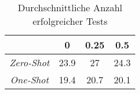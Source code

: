 \bgroup
\def\arraystretch{2}
\begin{table}[H]
	\vspace{.5cm}
	\centering		
	\begin{center}
		\begin{tabular}{|c||c|c|c|}
			\hline 
			& 0 & 0.25 & 0.5 \\
			\hline 
			\hline
			\textit{Zero-Shot} & 23.9 & 27 & 24.3 \\
			\hline
			\textit{One-Shot} & 19.4 & 20.7 & 20.1 \\
			\hline
		\end{tabular} 
	\end{center}
	\caption{Durchschnittliche Anzahl erfolgreicher Tests}
	\label{fig:succ-unit}
	\vspace{-.8cm}
\end{table}
\egroup